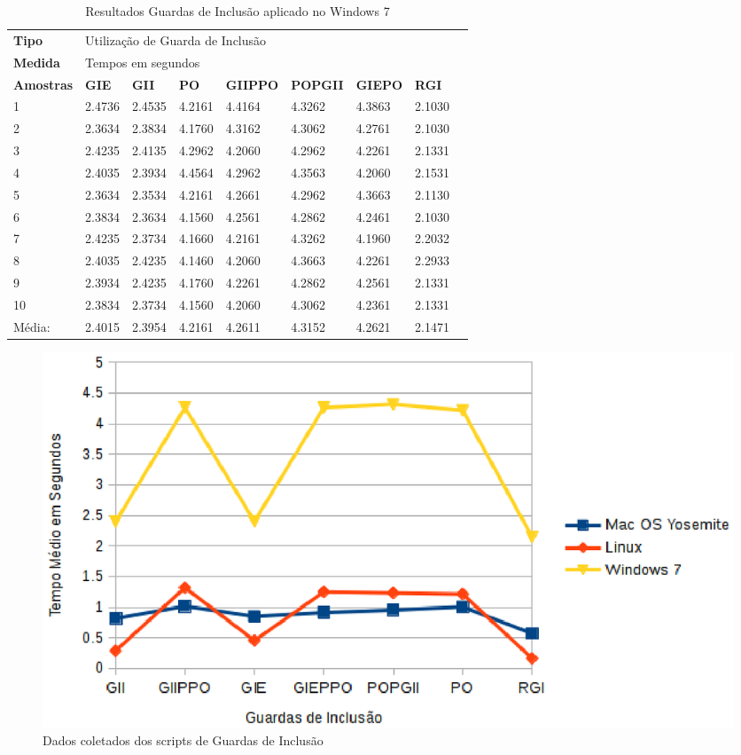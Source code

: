 \begin{apendicesenv}
\begin{table}[!ht]
\centering
\caption{Resultados Guardas de Inclusão aplicado no Windows 7}
\label{tab:resutados_guards_de_inclusao:windows7}
\begin{tiny}
\begin{tabular}{lp{1cm}p{1cm}p{1cm}p{1cm}p{1cm}p{1cm}p{1cm}p{1cm}}
\textbf{Tipo} & \multicolumn{7}{l}{Utilização de Guarda de Inclusão} \\
\textbf{Medida} & \multicolumn{7}{l}{Tempos em segundos } \\
\textbf{Amostras} & \textbf{GIE} & \textbf{GII} & \textbf{PO} & 
\textbf{GIIPPO} & \textbf{POPGII} & \textbf{GIEPO} & \textbf{RGI} \\ \toprule
 1      & 2.4736 & 2.4535 & 4.2161 & 4.4164 & 4.3262 & 4.3863  & 2.1030 \\ 
 2      & 2.3634 & 2.3834 & 4.1760 & 4.3162 & 4.3062 & 4.2761  & 2.1030 \\ 
 3      & 2.4235 & 2.4135 & 4.2962 & 4.2060 & 4.2962 & 4.2261  & 2.1331 \\ 
 4      & 2.4035 & 2.3934 & 4.4564 & 4.2962 & 4.3563 & 4.2060  & 2.1531 \\ 
 5      & 2.3634 & 2.3534 & 4.2161 & 4.2661 & 4.2962 & 4.3663  & 2.1130 \\ 
 6      & 2.3834 & 2.3634 & 4.1560 & 4.2561 & 4.2862 & 4.2461  & 2.1030 \\ 
 7      & 2.4235 & 2.3734 & 4.1660 & 4.2161 & 4.3262 & 4.1960  & 2.2032 \\ 
 8      & 2.4035 & 2.4235 & 4.1460 & 4.2060 & 4.3663 & 4.2261  & 2.2933 \\ 
 9      & 2.3934 & 2.4235 & 4.1760 & 4.2261 & 4.2862 & 4.2561  & 2.1331 \\ 
 10     & 2.3834 & 2.3734 & 4.1560 & 4.2060 & 4.3062 & 4.2361  & 2.1331 \\ \bottomrule 
 Média: & 2.4015 & 2.3954 & 4.2161 & 4.2611 & 4.3152 & 4.2621  & 2.1471 \\
\end{tabular}
\end{tiny}
\end{table}

\begin{figure}[!h]
    \centering
        \includegraphics{figuras/graficos/benchmark.eps}
    \caption{Dados coletados dos scripts de Guardas de Inclusão}
    \label{benchmark_guardas_de_inclusao}
\end{figure}


\end{apendicesenv}
